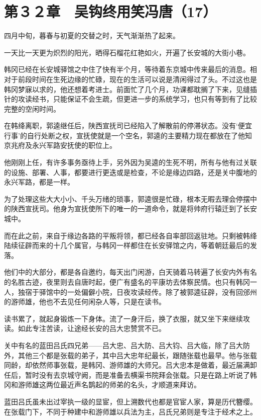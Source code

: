 \section{第３２章　吴钩终用笑冯唐（17）}

四月中旬，暮春与初夏的交替之时，天气渐渐热了起来。

一天比一天更为炽烈的阳光，晒得石榴花红艳如火，开遍了长安城的大街小巷。

韩冈已经在长安城驿馆之中住了快有半个月，等待着东京城中传来最后的消息。相对于前段时间在生死边缘的忙碌，现在的生活可以说是清闲得过了头。不过这也是韩冈梦寐以求的，他还想着考进士。前面忙了几个月，功课都耽搁了下来，见缝插针的攻读经书，只能保证不会生疏，但更进一步的系统学习，也只有等到有了比较完整的空闲时间。

在韩绛离职，郭逵继任后，陕西宣抚司已经陷入了解散前的停滞状态。没有‘便宜行事’的自行处断之权，宣抚使就是一个空名，郭逵的主要精力现在都放在了他知京兆府及永兴军路安抚使的职位上。

他刚刚上任，有许多事务亟待上手，另外因为吴逵的生死不明，所有与他有过关联的设施、部署、人事，都要进行更迭或是检查，不论是缘边四路，还是关中腹地的永兴军路，都是一样。

为了处理这些大大小小、千头万绪的琐事，郭逵很是忙碌，根本无暇去理会停摆中的陕西宣抚司。他身为宣抚使所下的唯一的一道命令，就是将帅府行辕迁到了长安城中。

而在此之前，来自于缘边各路的平叛将领，都已经各自率部回返驻地。只剩被韩绛陆续征辟而来的十几个属官，与韩冈一样都住在长安驿馆之内，等着朝廷最后的发落。

他们中的大部分，都是各自邀约，每天出门闲游，白天骑着马转遍了长安内外有名的名胜古迹，夜里则去自唐时起，便广有盛名的平康坊去体察民情。也只有韩冈一人，独宿于驿馆中的一处偏僻小院，日夜攻读经传。除了被郭逵征辟，没有回邠州的游师雄，他也不去见任何闲杂人等，只是在读书。

读书累了，就起身锻炼一下身体。流了一身汗后，换了衣服，就又坐下来继续攻读。如此专注苦读，让途经长安的吕大忠赞赏不已。

关中有名的蓝田吕氏四兄弟——吕大忠、吕大防、吕大钧、吕大临，除了吕大防外，其他三个都是张载的弟子，其中吕大忠年纪最长，跟随张载也最早。他与张载同龄，却依然师事张载，是韩冈、游师雄的大师兄。吕大忠本是做着，最近届满卸任后，暂时没有去京城守阙，而是准备去横渠书院拜会张载。只是在路上听说了韩冈和游师雄这两位最近声名鹊起的师弟的名头，才顺道来拜访。

蓝田吕氏虽未出过宰执一级的显宦，但上溯数代也都是官宦人家，算是历代簪缨。在张载门下，不同于种建中和游师雄以兵法为主，吕氏兄弟则是专注于经术之上。

